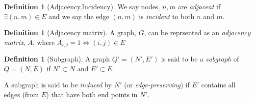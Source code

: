 \documentclass[a4paper,10pt]{article}
\theoremstyle{definition}
\newtheorem{definition}[theorem]{Definition}
\theoremstyle{definition}
\theoremstyle{remark}
\theoremstyle{definition}
\begin{document}
\begin{definition}[Adjacency,Incidency]
We say nodes, $n,m$ are \textit{adjacent} if $\exists (n,m) \in E$ and we say the edge $(n,m)$ is \textit{incident} to both $n$ and $m$.
\end{definition}

\begin{definition}[Adjacency matrix]
A graph, $G$, can be reprsented as an \textit{adjacency matrix}, $A$, where $A_{i,j}=1 \iff (i,j) \in E$
\end{definition}

\begin{definition}[Subgraph]
A graph $Q'=(N',E')$ is said to be a \textit{subgraph} of $Q=(N,E)$ if $N' \subset N$ and $E' \subset E$.

A subgraph is said to be \textit{induced} by $N'$ (or \textit{edge-preserving}) if $E'$ contains all edges (from $E$) that have both end points in $N'$.
\end{definition}
\end{document}
